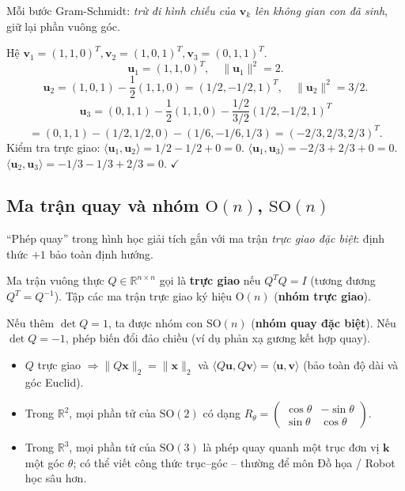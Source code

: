 \documentclass[12pt,a4paper]{article}
\begin{document}
\begin{ynghia}
Mỗi bước Gram-Schmidt: \emph{trừ đi hình chiếu của $\mathbf{v}_k$ lên không gian con đã sinh}, giữ lại phần vuông góc.
\end{ynghia}

\begin{vidu}[title={Gram-Schmidt trong $\mathbb{R}^3$}]
Hệ $\mathbf{v}_1 = (1, 1, 0)^T, \mathbf{v}_2 = (1, 0, 1)^T, \mathbf{v}_3 = (0, 1, 1)^T$.
\[
  \mathbf{u}_1 = (1, 1, 0)^T,\quad \|\mathbf{u}_1\|^2 = 2.
\]
\[
  \mathbf{u}_2 = (1, 0, 1) - \dfrac{1}{2}(1, 1, 0) = (1/2, -1/2, 1)^T,\quad \|\mathbf{u}_2\|^2 = 3/2.
\]
\[
  \mathbf{u}_3 = (0, 1, 1) - \dfrac{1}{2}(1, 1, 0) - \dfrac{1/2}{3/2}(1/2, -1/2, 1)^T
\]
\[
  = (0,1,1) - (1/2, 1/2, 0) - (1/6, -1/6, 1/3) = (-2/3, 2/3, 2/3)^T.
\]
Kiểm tra trực giao: $\langle \mathbf{u}_1, \mathbf{u}_2\rangle = 1/2 - 1/2 + 0 = 0$. $\langle \mathbf{u}_1, \mathbf{u}_3\rangle = -2/3 + 2/3 + 0 = 0$. $\langle \mathbf{u}_2, \mathbf{u}_3\rangle = -1/3 - 1/3 + 2/3 = 0$. $\checkmark$
\end{vidu}

\subsection{Ma trận quay và nhóm $\mathrm{O}(n)$, $\mathrm{SO}(n)$}

\begin{dongco}
``Phép quay'' trong hình học giải tích gắn với ma trận \emph{trực giao đặc biệt}: định thức $+1$ bảo toàn định hướng.
\end{dongco}

\begin{dinhnghia}
Ma trận vuông thực $Q \in \mathbb{R}^{n \times n}$ gọi là \textbf{trực giao} nếu $Q^T Q = I$ (tương đương $Q^T = Q^{-1}$). Tập các ma trận trực giao ký hiệu $\mathrm{O}(n)$ (\textbf{nhóm trực giao}).

Nếu thêm $\det Q = 1$, ta được nhóm con $\mathrm{SO}(n)$ (\textbf{nhóm quay đặc biệt}). Nếu $\det Q = -1$, phép biến đổi đảo chiều (ví dụ phản xạ gương kết hợp quay).
\end{dinhnghia}

\begin{tinhchat}
\begin{itemize}
  \item $Q$ trực giao $\Rightarrow \|Q\mathbf{x}\|_2 = \|\mathbf{x}\|_2$ và $\langle Q\mathbf{u}, Q\mathbf{v}\rangle = \langle \mathbf{u}, \mathbf{v}\rangle$ (bảo toàn độ dài và góc Euclid).
  \item Trong $\mathbb{R}^2$, mọi phần tử của $\mathrm{SO}(2)$ có dạng $R_\theta = \begin{pmatrix}\cos\theta & -\sin\theta\\ \sin\theta & \cos\theta\end{pmatrix}$.
  \item Trong $\mathbb{R}^3$, mọi phần tử của $\mathrm{SO}(3)$ là phép quay quanh một trục đơn vị $\mathbf{k}$ một góc $\theta$; có thể viết công thức trục--góc -- thường để môn Đồ họa / Robot học sâu hơn.
\end{itemize}
\end{tinhchat}
\end{document}
